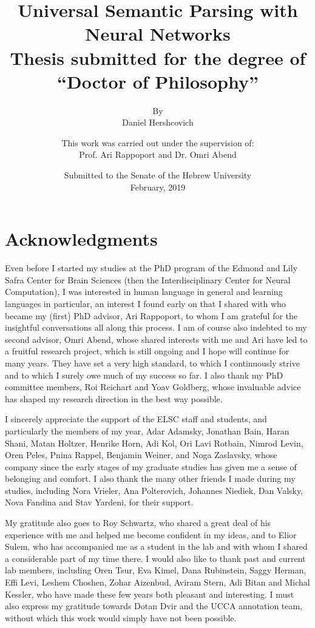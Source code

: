 \documentclass[12pt,a4paper,table]{report}
\title{
\textbf{Universal Semantic Parsing with Neural Networks} \\
\vspace{2cm}
{\large Thesis submitted for the degree of \\
``Doctor of Philosophy''}
}
\author{
By \\
Daniel Hershcovich
\vspace{2cm}
}
\date{
Submitted to the Senate of the Hebrew University \\
February, 2019
}
\begin{document}
\maketitle
\maketitle
\clearpage
\title{}
\author{
This work was carried out under the supervision of: \\
Prof. Ari Rappoport and Dr. Omri Abend
}
\date{}
\maketitle

\section*{Acknowledgments}

Even before I started my studies at the PhD program of
the Edmond and Lily Safra Center for Brain Sciences
(then the Interdisciplinary Center for Neural Computation),
I was interested in human language in general and learning languages
in particular, an interest I found early on that I shared with who became
my (first) PhD advisor, Ari Rappoport, to whom I am grateful for the
insightful conversations all along this process.
I am of course also indebted to my second advisor, Omri Abend,
whose shared interests with me and Ari have led to a fruitful
research project, which is still ongoing and I hope will continue for
many years.
They have set a very high standard, to which I continuously strive
and to which I surely owe much of my success so far.
I also thank my PhD committee members, Roi Reichart and Yoav Goldberg,
whose invaluable advice has shaped my research direction in the best way possible.

I sincerely appreciate the support of the ELSC staff and students,
and particularly the members of my year,
Adar Adamsky, Jonathan Bain, Haran Shani, Matan Holtzer, Henrike Horn, Adi Kol,
Ori Lavi Rotbain, Nimrod Levin, Oren Peles, Pnina Rappel, Benjamin Weiner, and
Noga Zaslavsky, whose company since the early stages of my graduate studies
has given me a sense of belonging and comfort.
I also thank the many other friends I made during my studies, including Nora Vrieler,
Ana Polterovich, Johannes Niediek, Dan Valsky, Nova Fandina and Stav Yardeni,
for their support.

My gratitude also goes to Roy Schwartz, who shared a great deal of his
experience with me and helped me become confident in my ideas, and to
Elior Sulem, who has accompanied me as a student in the lab and with whom
I shared a considerable part of my time there.
I would also like to thank past and current lab members, including Oren Tsur,
Eva Kimel, Dana Rubinstein, Saggy Herman, Effi Levi, Leshem Choshen, Zohar Aizenbud,
Aviram Stern, Adi Bitan and Michal Kessler, who have made these few years both
pleasant and interesting.
I must also express my gratitude towards Dotan Dvir and the UCCA annotation team,
without which this work would simply have not been possible.
\end{document}
